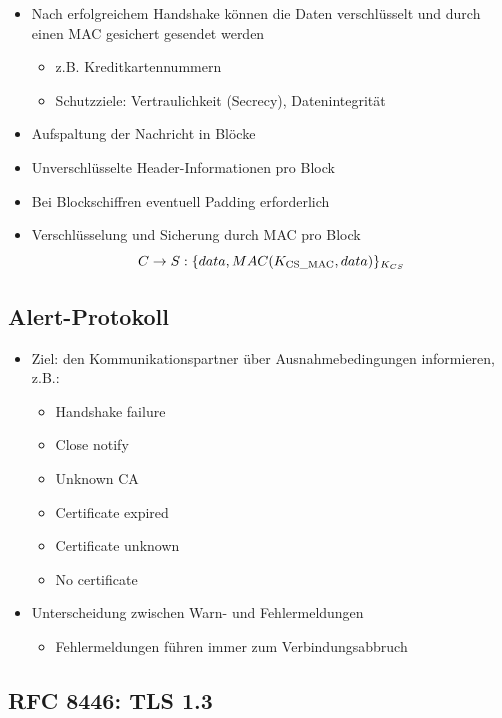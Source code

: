 \documentclass[openany]{book}
\begin{document}
\begin{itemize}
    \item Nach erfolgreichem Handshake können die Daten verschlüsselt und durch einen MAC gesichert gesendet werden 
    \begin{itemize}
        \item z.B. Kreditkartennummern
        \item Schutzziele: Vertraulichkeit (Secrecy), Datenintegrität
    \end{itemize}
    \item Aufspaltung der Nachricht in Blöcke
    \item Unverschlüsselte Header-Informationen pro Block
    \item Bei Blockschiffren eventuell Padding erforderlich
    \item Verschlüsselung und Sicherung durch MAC pro Block $$C\rightarrow S:\{data, MAC(K_{\text{CS\textunderscore MAC}},data)\}_{K_{CS}}$$ 
\end{itemize}

\subsection{Alert-Protokoll}

\begin{itemize}
    \item Ziel: den Kommunikationspartner über Ausnahmebedingungen informieren, z.B.:
    \begin{itemize}
        \item Handshake failure
        \item Close notify
        \item Unknown CA
        \item Certificate expired
        \item Certificate unknown
        \item No certificate
    \end{itemize}
    \item Unterscheidung zwischen Warn- und Fehlermeldungen
    \begin{itemize}
        \item Fehlermeldungen führen immer zum Verbindungsabbruch
    \end{itemize}
\end{itemize}

\subsection{RFC 8446: TLS 1.3}
\end{document}
